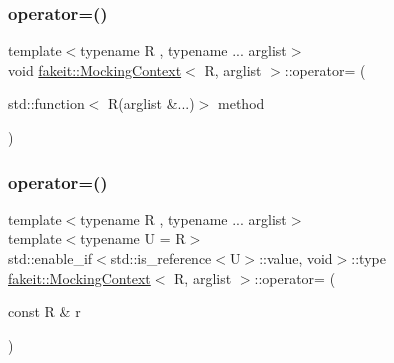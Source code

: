 \subsubsection{\texorpdfstring{operator=()}{operator=()}\hspace{0.1cm}{\footnotesize\ttfamily [16/27]}}
{\footnotesize\ttfamily template$<$typename R , typename ... arglist$>$ \\
void \mbox{\hyperlink{classfakeit_1_1MockingContext}{fakeit\+::\+Mocking\+Context}}$<$ R, arglist $>$\+::operator= (\begin{DoxyParamCaption}\item[{std\+::function$<$ R(arglist \&...)$>$}]{method }\end{DoxyParamCaption})\hspace{0.3cm}{\ttfamily [inline]}}

\mbox{\label{classfakeit_1_1MockingContext_ad5e903b223858dbe67f1da1523ef0d60}} 
\subsubsection{\texorpdfstring{operator=()}{operator=()}\hspace{0.1cm}{\footnotesize\ttfamily [17/27]}}
{\footnotesize\ttfamily template$<$typename R , typename ... arglist$>$ \\
template$<$typename U  = R$>$ \\
std\+::enable\+\_\+if$<$std\+::is\+\_\+reference$<$U$>$\+::value, void$>$\+::type \mbox{\hyperlink{classfakeit_1_1MockingContext}{fakeit\+::\+Mocking\+Context}}$<$ R, arglist $>$\+::operator= (\begin{DoxyParamCaption}\item[{const R \&}]{r }\end{DoxyParamCaption})\hspace{0.3cm}{\ttfamily [inline]}}

\mbox{\label{classfakeit_1_1MockingContext_adfac3df2408adaa86efec81bd5533a6d}} 
